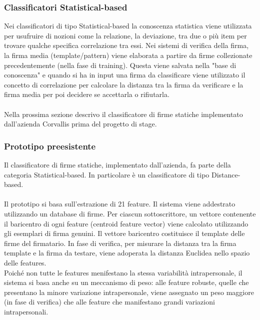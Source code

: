 \subsubsection*{Classificatori Statistical-based}
\label{2.1.3.2}
Nei classificatori di tipo Statistical-based la conoscenza statistica viene utilizzata per usufruire di nozioni come la relazione, la deviazione, tra due o più item per trovare qualche specifica correlazione tra essi. Nei sistemi di verifica della firma, la firma media (template/pattern) viene elaborata a partire da firme collezionate precedentemente (nella fase di training). Questa viene salvata nella "base di conoscenza" e quando si ha in input una firma da classificare viene utilizzato il concetto di correlazione per calcolare la distanza tra la firma da verificare e la firma media per poi decidere se accettarla o rifiutarla.\\\\

Nella prossima sezione descrivo il classificatore di firme statiche implementato dall'azienda Corvallis prima del progetto di stage.
\subsubsection{Prototipo preesistente}
\label{2.1.4}
Il classificatore di firme statiche, implementato dall'azienda, fa parte della categoria Statistical-based. In particolare è un classificatore di tipo Distance-based.\\\\
Il prototipo si basa sull'estrazione di 21 feature.
Il sistema viene addestrato utilizzando un database di firme. Per ciascun sottoscrittore, un vettore contenente il baricentro di ogni feature (centroid feature vector) viene calcolato utilizzando gli esemplari di firma genuini. Il vettore baricentro costituisce il template delle firme del firmatario. In fase di verifica, per misurare la distanza tra la firma template e la firma da testare, viene adoperata la distanza Euclidea nello spazio delle features.\\
Poiché non tutte le features menifestano la stessa variabilità intrapersonale, il sistema si basa anche su un meccanismo di peso: alle feature robuste, quelle che presentano la minore variazione intrapersonale, viene assegnato un peso maggiore (in fase di verifica) che alle feature che manifestano grandi variazioni intrapersonali.
